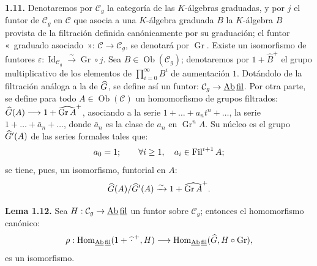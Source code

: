 \providecommand{\sisi}[2]{#2}

\textbf{1.11.} Denotaremos por \(\mathcal C_g\) la categoría de las \(K\)-álgebras graduadas, y por \(j\) el funtor de \(\mathcal C_g\) en \(\mathcal C\) que asocia a una \(K\)-álgebra graduada \(B\) la \(K\)-álgebra \(B\) provista de la filtración definida canónicamente por su graduación; el funtor «~graduado asociado~»: \(\mathcal C\to\mathcal C_g\), se denotará por \(\operatorname{Gr}\). Existe un isomorfismo de funtores \(\varepsilon:\operatorname{Id}_{\mathcal C_g}\xrightarrow{\sim}\operatorname{Gr}\circ j\).
Sea \(B\in\operatorname{Ob}(\mathcal C_g)\); denotaremos por \(1+\widehat B^+\) el grupo multiplicativo de los elementos de \(\prod\limits_{i=0}^{\infty}B^i\) de aumentación \(1\). Dotándolo de la filtración análoga a la de \(\widehat G\), se define así un funtor: \(\mathcal C_g\to\underline{\mathrm{Ab}}\,\underline{\mathrm{fil}}\). Por otra parte, se define para todo \(A\in\operatorname{Ob}(\mathcal C)\) un homomorfismo de grupos filtrados: \(\widehat G(A)\longrightarrow 1+\widehat{\operatorname{Gr}A}^{+}\), asociando a la serie \(1+\ldots+a_nt^n+\ldots\), la serie \(1+\ldots+\bar a_n+\ldots\), donde \(\bar a_n\) es la clase de \(a_n\) en \(\operatorname{Gr}^nA\). Su núcleo es el grupo \(\widehat G'(A)\) de las series formales tales que:
\[
  a_0=1;\qquad \forall i\geq1,\quad a_i\in\operatorname{Fil}^{i+1}A;
\]
se tiene, pues, un isomorfismo, funtorial en \(A\):
\[
  \widehat G(A)/\widehat G'(A)\xrightarrow{\sim}1+\widehat{\operatorname{Gr}A}^{+}.
\]

\textbf{Lema 1.12.} Sea \(H:\mathcal C_g\to\underline{\mathrm{Ab}}\,\underline{\mathrm{fil}}\) un funtor sobre \(\mathcal C_g\); entonces el homomorfismo canónico:
\[
  \rho:\operatorname{Hom}_{\underline{\mathrm{Ab}}\,\underline{\mathrm{fil}}}(1+\widehat{\,\cdot\,}^{+},H)
  \longrightarrow
  \operatorname{Hom}_{\underline{\mathrm{Ab}}\,\underline{\mathrm{fil}}}(\widehat G,H\circ\operatorname{Gr}),
\]
es un isomorfismo.

